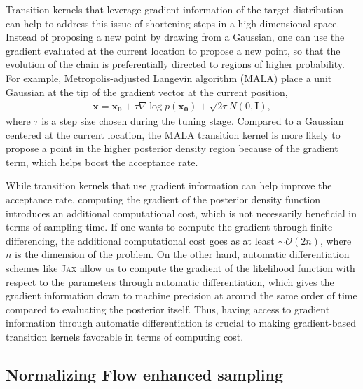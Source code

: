 \documentclass[twocolumn]{aastex631}
\begin{document}
Transition kernels that leverage gradient information of the target
distribution can help to address this issue of shortening steps in a high
dimensional space. Instead of proposing a new point by drawing from a Gaussian,
one can use the gradient evaluated at the current location to propose a new
point, so that the evolution of the chain is preferentially directed to regions
of higher probability. For example, Metropolis-adjusted Langevin algorithm
(MALA) \cite{10.2307/2346184} place a unit Gaussian at the tip of the gradient
vector at the current position,
\begin{align}
    \mathbf{x} = \mathbf{x_0} + \tau \nabla\log{p(\mathbf{x_0})} + \sqrt{2\tau}N(0,\mathbf{I}),
\end{align}
where $\tau$ is a step size chosen during the tuning stage. Compared to a
Gaussian centered at the current location, the MALA transition kernel is more
likely to propose a point in the higher posterior density region because of
the gradient term, which helps boost the acceptance rate.

While transition kernels that use gradient information can help improve the
acceptance rate, computing the gradient of the posterior density function
introduces an additional computational cost, which is not necessarily
beneficial in terms of sampling time. If one wants to compute the gradient
through finite differencing, the additional computational cost goes as at least
${\sim} \mathcal{O}(2n)$, where $n$ is the dimension of the problem. On the
other hand, automatic differentiation schemes like \textsc{Jax} allow us to
compute the gradient of the likelihood function with respect to the parameters
through automatic differentiation, which gives the gradient information down to
machine precision at around the same order of time compared to evaluating the
posterior itself. Thus, having access to gradient information through automatic
differentiation is crucial to making gradient-based transition kernels
favorable in terms of computing cost.

\subsection{Normalizing Flow enhanced sampling}
\label{sec:flow}
\end{document}
